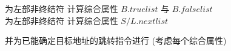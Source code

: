 \begin{frame}{}
  \begin{center}
    为左部非终结符  计算综合属性 $B.\mathit{truelist}$ 与 $B.\mathit{falselist}$ \\[5pt]
    为左部非终结符  计算综合属性 $S/L.\mathit{nextlist}$


    并为已能确定目标地址的跳转指令进行 (考虑每个综合属性)
  \end{center}
\end{frame}

\begin{frame}{}
  \begin{columns}
  \end{columns}
\end{frame}
